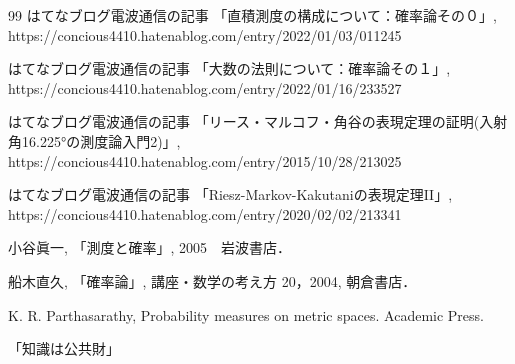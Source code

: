 \documentclass[leqno, a4paper, 12pt]{jsarticle}
\begin{document}
	
\begin{thebibliography}{99}
はてなブログ電波通信の記事
「直積測度の構成について：確率論その０」, 
https://concious4410.hatenablog.com/entry/2022/01/03/011245

はてなブログ電波通信の記事
「大数の法則について：確率論その１」, 
https://concious4410.hatenablog.com/entry/2022/01/16/233527

はてなブログ電波通信の記事
「リース・マルコフ・角谷の表現定理の証明(入射角16.225°の測度論入門2)」, 
https://concious4410.hatenablog.com/entry/2015/10/28/213025

はてなブログ電波通信の記事
「Riesz-Markov-Kakutaniの表現定理II」, 
https://concious4410.hatenablog.com/entry/2020/02/02/213341


小谷眞一, 「測度と確率」, 2005　岩波書店．

船木直久, 「確率論」, 
講座・数学の考え方 20，2004, 朝倉書店．

K. R. Parthasarathy,  Probability measures on metric spaces. 
Academic Press. 
\end{thebibliography}

「知識は公共財」


			
\end{document}
